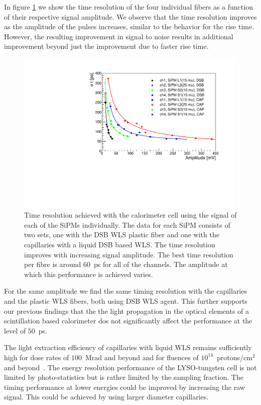 In figure \ref{TimeResolution} we show the time resolution of the four
individual fibers as a function of their respective signal amplitude. We observe 
that the time resolution improves as the amplitude of the pulses increases, 
similar to the behavior for the rise time. However, the resulting improvement in 
signal to noise results in additional improvement beyond just the improvement due
to faster rise time. 

%
\begin{figure}[htb]
\includegraphics[width=0.99\textwidth]{figures/ShashlikTimeResolution.pdf}
\caption{\label{TimeResolution} Time resolution achieved with the calorimeter cell using the signal of each 
of the  SiPMs individually. The data for each SiPM consists of two sets, one with the DSB WLS plastic fiber and one with 
the capillaries with a liquid DSB based WLS. The time resolution improves with increasing signal amplitude. The best time 
resolution per fibre is around $60$~ps for all of the channels. The amplitude at which this performance is achieved varies.}
\end{figure}
%


For the same amplitude we find the same timing resolution with the capillaries
and the plastic WLS fibers, both using DSB WLS agent. This further supports our
previous findings that the the light propagation in the optical elements of a
scintillation based calorimeter dos not significantly affect the performance at
the level of $50$~ps.

The light extraction efficiency of capillaries with liquid WLS remains
sufficiently high for dose rates of $100$~Mrad and beyond and for fluences of
$10^{14}$~protons/$\mathrm{cm}^{2}$ and beyond~\cite{shashlik2}. The
energy resolution performance of the LYSO-tungsten cell is not limited by
photo-statistics but is rather limited by the sampling fraction. The timing
performance at lower energies could be improved by increasing the raw signal.
This could be achieved by using larger diameter capillaries.\\ 

